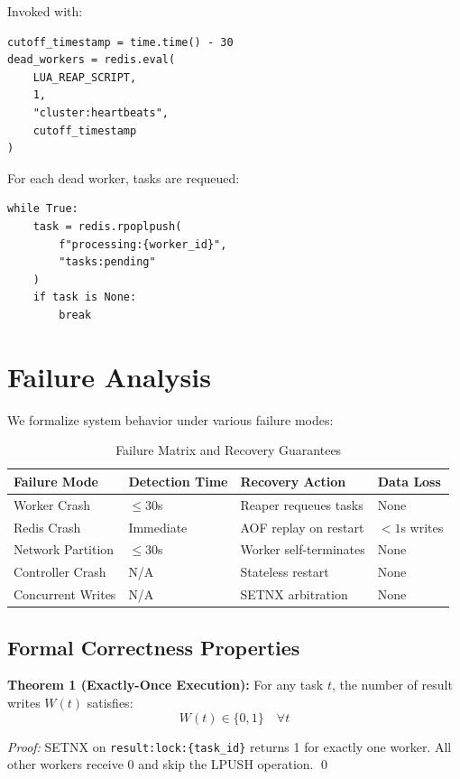 \documentclass[11pt,a4paper]{article}
\begin{document}
Invoked with:
\begin{lstlisting}[style=pythonstyle]
cutoff_timestamp = time.time() - 30
dead_workers = redis.eval(
    LUA_REAP_SCRIPT,
    1,
    "cluster:heartbeats",
    cutoff_timestamp
)
\end{lstlisting}

For each dead worker, tasks are requeued:
\begin{lstlisting}[style=pythonstyle]
while True:
    task = redis.rpoplpush(
        f"processing:{worker_id}",
        "tasks:pending"
    )
    if task is None:
        break
\end{lstlisting}

\section{Failure Analysis}

We formalize system behavior under various failure modes:

\begin{table}[h]
\centering
\begin{tabular}{@{}llll@{}}
\toprule
\textbf{Failure Mode} & \textbf{Detection Time} & \textbf{Recovery Action} & \textbf{Data Loss} \\ \midrule
Worker Crash & $\leq 30$s & Reaper requeues tasks & None \\
Redis Crash & Immediate & AOF replay on restart & $< 1$s writes \\
Network Partition & $\leq 30$s & Worker self-terminates & None \\
Controller Crash & N/A & Stateless restart & None \\
Concurrent Writes & N/A & SETNX arbitration & None \\ \bottomrule
\end{tabular}
\caption{Failure Matrix and Recovery Guarantees}
\label{tab:failure_matrix}
\end{table}

\subsection{Formal Correctness Properties}

\textbf{Theorem 1 (Exactly-Once Execution):} For any task $t$, the number of result writes $W(t)$ satisfies:
\begin{equation}
W(t) \in \{0, 1\} \quad \forall t
\end{equation}

\textit{Proof:} SETNX on \texttt{result:lock:\{task\_id\}} returns 1 for exactly one worker. All other workers receive 0 and skip the LPUSH operation. \qed
\end{document}
